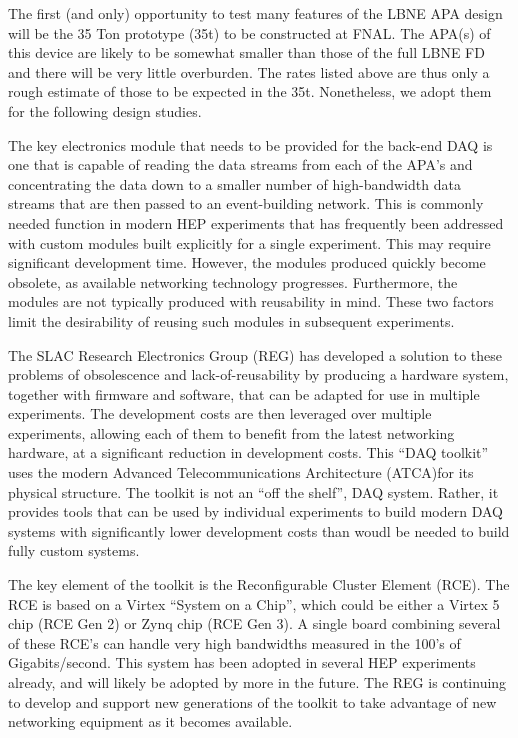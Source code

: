 The first (and only) opportunity to test many features of the LBNE APA 
design will be the 35 Ton prototype (35t) to be constructed at FNAL.
The APA(s) of this device are likely to be somewhat smaller than 
those of the full LBNE FD and there will be very little overburden.
The rates listed above are thus only a rough estimate of those to be
expected in the 35t.
Nonetheless, we adopt them for the following design studies.

The key electronics module that needs to be provided for the back-end DAQ is 
one that is capable of reading the data streams from each of the
APA's and concentrating the data down to a smaller number of high-bandwidth 
data streams that are then passed to an event-building network.
This is commonly needed function in modern HEP experiments that has frequently 
been addressed with custom modules built explicitly for a single experiment.
This may require significant development time.
However, the modules produced quickly
become obsolete, as available networking technology progresses.
Furthermore, the modules are not typically produced with reusability
in mind.
These two factors limit the desirability of reusing such modules in 
subsequent experiments.

The SLAC Research Electronics Group (REG) has developed a solution to these 
problems of obsolescence and lack-of-reusability
by producing a hardware system, together with firmware and software, that can
be adapted for use in multiple experiments.
The development costs are then leveraged over multiple experiments, allowing 
each of them to benefit from the latest networking hardware, at a significant 
reduction in development costs. 
This ``DAQ toolkit'' uses the modern Advanced Telecommunications Architecture 
(ATCA)for its physical structure.
The toolkit is not an ``off the shelf'', DAQ system.
Rather, it provides tools that can be used by individual experiments to 
build modern DAQ systems with significantly lower development costs than
woudl be needed to build fully custom systems.

The key element of the toolkit is the Reconfigurable Cluster Element (RCE).
The RCE is based on a Virtex  ``System on a Chip'', which could be 
either a Virtex 5 chip (RCE Gen 2) or Zynq chip (RCE Gen 3).
A single board combining several of these RCE's can handle very high bandwidths measured
in the 100's of Gigabits/second. 
This system has been adopted in several HEP experiments already, and will likely 
be adopted by more in the future. 
The REG is continuing to develop and support new generations 
of the toolkit to take advantage of new networking equipment as it becomes available.


